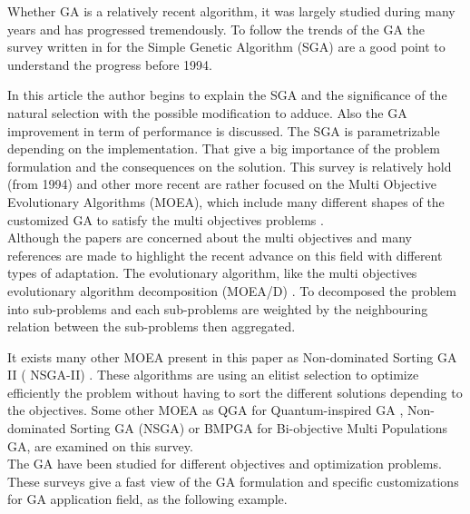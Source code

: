 Whether GA is a relatively recent algorithm, it was largely studied during many years and has progressed tremendously. To follow the trends of the GA  the survey  written in \cite{74*srinivas1994} for the Simple Genetic Algorithm (SGA) are a good point to understand the progress before 1994. 

In this article \cite{74*srinivas1994} the author begins to explain the SGA and the significance of the natural selection with the possible modification to adduce. 
Also the GA improvement  in term of performance is discussed. The SGA is parametrizable depending on the implementation. That give a big importance of the problem formulation and the consequences on the solution.
 This survey is  relatively hold (from 1994) and other more recent are rather focused on the Multi Objective Evolutionary Algorithms (MOEA), which include many different shapes of the customized GA to satisfy the multi objectives problems \cite{75*zhou2011}. \\
Although the papers are concerned about the multi objectives and many references are made to highlight the recent advance on this field with different types of adaptation. The evolutionary algorithm, like the multi objectives evolutionary algorithm decomposition (MOEA/D) \cite{114*zhang2007}. To decomposed the problem into sub-problems and each sub-problems are weighted by the neighbouring relation between the sub-problems then aggregated.   

It exists many other MOEA present in this paper as Non-dominated Sorting GA II ( NSGA-II) \cite{69*deb2000}. These algorithms are using an elitist selection to optimize efficiently the problem without having to sort the different solutions depending to the objectives. Some other MOEA as QGA for Quantum-inspired GA \cite{ 69*deb2000,han2000,han2002}%
, Non-dominated Sorting GA  (NSGA) or BMPGA for Bi-objective Multi Populations GA,  are examined on this survey\cite{69*deb2000}. \\
The GA have been studied for different objectives and optimization problems. These surveys  give a fast  view of  the GA formulation and  specific customizations for  GA application field, as the following example.\\

